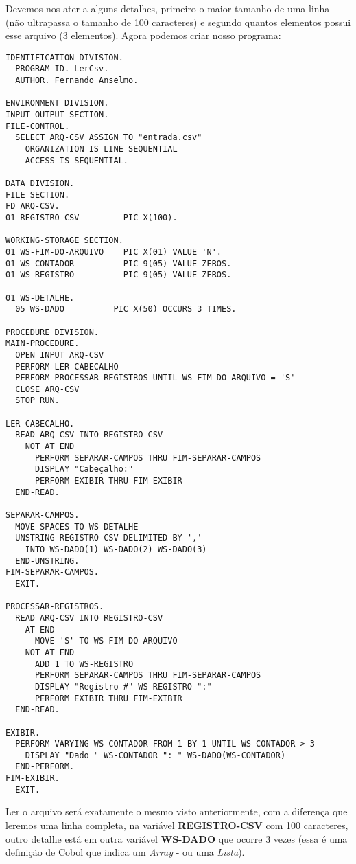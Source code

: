Devemos nos ater a alguns detalhes, primeiro o maior tamanho de uma linha (não ultrapassa o tamanho de 100 caracteres) e segundo quantos elementos possui esse arquivo (3 elementos). Agora podemos criar nosso programa:
\begin{lstlisting}[]
IDENTIFICATION DIVISION.
  PROGRAM-ID. LerCsv.
  AUTHOR. Fernando Anselmo.

ENVIRONMENT DIVISION.
INPUT-OUTPUT SECTION.
FILE-CONTROL.
  SELECT ARQ-CSV ASSIGN TO "entrada.csv"
    ORGANIZATION IS LINE SEQUENTIAL
    ACCESS IS SEQUENTIAL.

DATA DIVISION.
FILE SECTION.
FD ARQ-CSV.
01 REGISTRO-CSV         PIC X(100).

WORKING-STORAGE SECTION.
01 WS-FIM-DO-ARQUIVO    PIC X(01) VALUE 'N'.
01 WS-CONTADOR          PIC 9(05) VALUE ZEROS.
01 WS-REGISTRO          PIC 9(05) VALUE ZEROS.

01 WS-DETALHE.
  05 WS-DADO          PIC X(50) OCCURS 3 TIMES.

PROCEDURE DIVISION.
MAIN-PROCEDURE.
  OPEN INPUT ARQ-CSV
  PERFORM LER-CABECALHO
  PERFORM PROCESSAR-REGISTROS UNTIL WS-FIM-DO-ARQUIVO = 'S'
  CLOSE ARQ-CSV
  STOP RUN.

LER-CABECALHO.
  READ ARQ-CSV INTO REGISTRO-CSV
    NOT AT END
      PERFORM SEPARAR-CAMPOS THRU FIM-SEPARAR-CAMPOS
      DISPLAY "Cabeçalho:"
      PERFORM EXIBIR THRU FIM-EXIBIR
  END-READ.

SEPARAR-CAMPOS.
  MOVE SPACES TO WS-DETALHE
  UNSTRING REGISTRO-CSV DELIMITED BY ','
    INTO WS-DADO(1) WS-DADO(2) WS-DADO(3)
  END-UNSTRING.
FIM-SEPARAR-CAMPOS.
  EXIT.

PROCESSAR-REGISTROS.
  READ ARQ-CSV INTO REGISTRO-CSV
    AT END
      MOVE 'S' TO WS-FIM-DO-ARQUIVO
    NOT AT END
      ADD 1 TO WS-REGISTRO
      PERFORM SEPARAR-CAMPOS THRU FIM-SEPARAR-CAMPOS
      DISPLAY "Registro #" WS-REGISTRO ":"
      PERFORM EXIBIR THRU FIM-EXIBIR
  END-READ.

EXIBIR.
  PERFORM VARYING WS-CONTADOR FROM 1 BY 1 UNTIL WS-CONTADOR > 3
    DISPLAY "Dado " WS-CONTADOR ": " WS-DADO(WS-CONTADOR)
  END-PERFORM.
FIM-EXIBIR.
  EXIT.	
\end{lstlisting}

Ler o arquivo será exatamente o mesmo visto anteriormente, com a diferença que leremos uma linha completa, na variável \textbf{REGISTRO-CSV} com 100 caracteres, outro detalhe está em outra variável \textbf{WS-DADO} que ocorre 3 vezes (essa é uma definição de Cobol que indica um \textit{Array} - ou uma \textit{Lista}).

